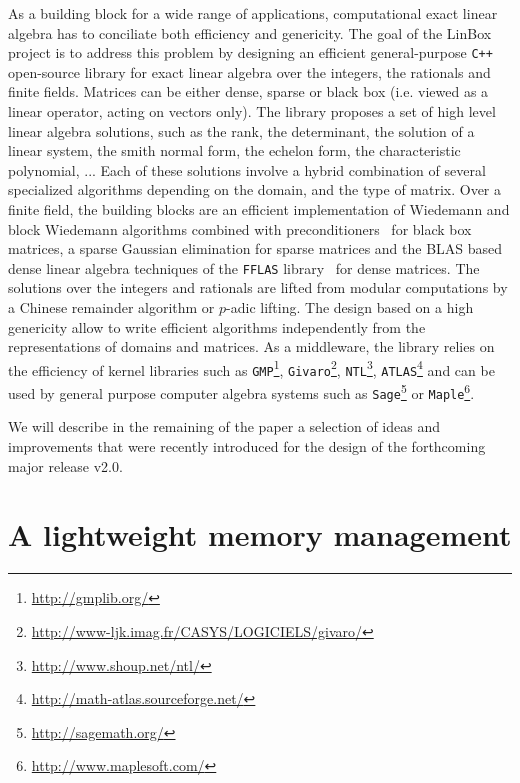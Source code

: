\documentclass[runningheads,a4paper]{llncs}
\newcommand{\linbox}{{\sc LinBox}\xspace}
\begin{document}
As a building block for a wide range of applications, computational exact linear
algebra has to conciliate both efficiency and genericity. The goal of the 
\linbox project is to address this problem by designing an efficient general-purpose
\texttt{C++} open-source library for exact linear algebra over the integers, the
rationals and finite fields. 
Matrices can be either dense, sparse or black box (i.e. viewed as a linear
operator, acting on vectors only). The library proposes a set of high level
linear algebra solutions, such as the rank, the determinant, the solution of a
linear system, the smith normal form, the echelon form, the characteristic
polynomial, ... Each of these solutions involve a hybrid combination of several specialized
algorithms depending on the domain, and the type of matrix. Over a finite field,
the building blocks are an efficient implementation of Wiedemann and block
Wiedemann algorithms combined with preconditioners~\cite{CEKSTV:2002:EP} for
black box matrices, a sparse Gaussian elimination for sparse matrices and the
BLAS based dense linear algebra techniques of the \texttt{FFLAS}
library~\cite{DGP:2008:dlaff} for dense matrices. The solutions over the integers
and rationals are lifted from modular computations by a Chinese remainder
algorithm or $p$-adic lifting.
The design based on a high genericity allow to write efficient algorithms  independently from the
representations of domains and matrices. As a middleware, the library relies on the
efficiency of kernel libraries such as  \texttt{GMP}\footnote{\url{http://gmplib.org/}},
\texttt{Givaro}\footnote{\url{http://www-ljk.imag.fr/CASYS/LOGICIELS/givaro/}},
\texttt{NTL}\footnote{\url{http://www.shoup.net/ntl/}},
\texttt{ATLAS}\footnote{\url{http://math-atlas.sourceforge.net/}} and can be used by general
purpose computer algebra systems such as \texttt{Sage}\footnote{\url{http://sagemath.org/}} or \texttt{Maple}\footnote{\url{http://www.maplesoft.com/}}. 

We will describe in the remaining of the paper a selection of ideas and
improvements that were recently introduced for the design of the forthcoming
major release v2.0.

\section{A lightweight memory management}

\end{document}
